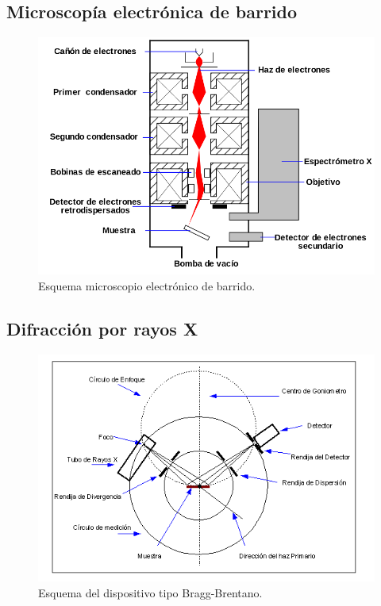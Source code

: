 \documentclass[11pt]{beamer}
\begin{document}
	\subsection{Microscopía electrónica de barrido}
		\begin{frame}{}
			\begin{figure}[H]
				\centering
				\includegraphics[scale=0.3]{img/SEM.png}
				\caption{Esquema microscopio electrónico de barrido.}
			\end{figure}
		\end{frame}
	
	\subsection{Difracción por rayos X}
		\begin{frame}{}
			\begin{figure}[H]
				\centering
				\includegraphics[scale=0.6]{img/gonio.png}
				\caption{Esquema del dispositivo tipo Bragg-Brentano.}
			\end{figure}
		\end{frame}
	
\end{document}
